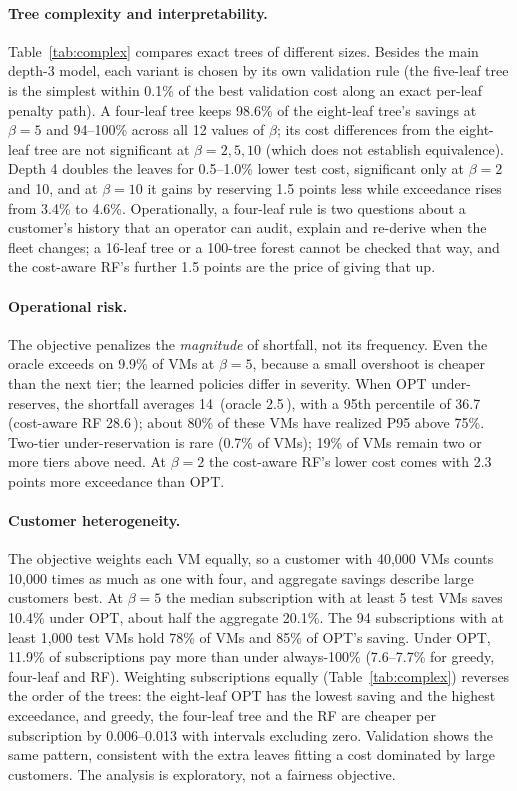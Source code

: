 \documentclass[10pt]{article}
\newcommand{\pp}{\,\text{pp}}
\begin{document}
\paragraph{Tree complexity and interpretability.} Table~\ref{tab:complex} compares exact trees of different sizes. Besides the main depth-3 model, each variant is chosen by its own validation rule (the five-leaf tree is the simplest within 0.1\% of the best validation cost along an exact per-leaf penalty path). A four-leaf tree keeps 98.6\% of the eight-leaf tree's savings at $\beta=5$ and 94--100\% across all 12 values of $\beta$; its cost differences from the eight-leaf tree are not significant at $\beta=2,5,10$ (which does not establish equivalence). Depth 4 doubles the leaves for 0.5--1.0\% lower test cost, significant only at $\beta=2$ and 10, and at $\beta=10$ it gains by reserving 1.5 points less while exceedance rises from 3.4\% to 4.6\%. Operationally, a four-leaf rule is two questions about a customer's history that an operator can audit, explain and re-derive when the fleet changes; a 16-leaf tree or a 100-tree forest cannot be checked that way, and the cost-aware RF's further 1.5 points are the price of giving that up.

\paragraph{Operational risk.} The objective penalizes the \emph{magnitude} of shortfall, not its frequency. Even the oracle exceeds on 9.9\% of VMs at $\beta=5$, because a small overshoot is cheaper than the next tier; the learned policies differ in severity. When OPT under-reserves, the shortfall averages 14\pp{} (oracle 2.5\pp), with a 95th percentile of 36.7\pp{} (cost-aware RF 28.6\pp); about 80\% of these VMs have realized P95 above 75\%. Two-tier under-reservation is rare (0.7\% of VMs); 19\% of VMs remain two or more tiers above need. At $\beta=2$ the cost-aware RF's lower cost comes with 2.3 points more exceedance than OPT.

\paragraph{Customer heterogeneity.} The objective weights each VM equally, so a customer with 40,000 VMs counts 10,000 times as much as one with four, and aggregate savings describe large customers best. At $\beta=5$ the median subscription with at least 5 test VMs saves 10.4\% under OPT, about half the aggregate 20.1\%. The 94 subscriptions with at least 1,000 test VMs hold 78\% of VMs and 85\% of OPT's saving. Under OPT, 11.9\% of subscriptions pay more than under always-100\% (7.6--7.7\% for greedy, four-leaf and RF). Weighting subscriptions equally (Table~\ref{tab:complex}) reverses the order of the trees: the eight-leaf OPT has the lowest saving and the highest exceedance, and greedy, the four-leaf tree and the RF are cheaper per subscription by 0.006--0.013 with intervals excluding zero. Validation shows the same pattern, consistent with the extra leaves fitting a cost dominated by large customers. The analysis is exploratory, not a fairness objective.
\end{document}
